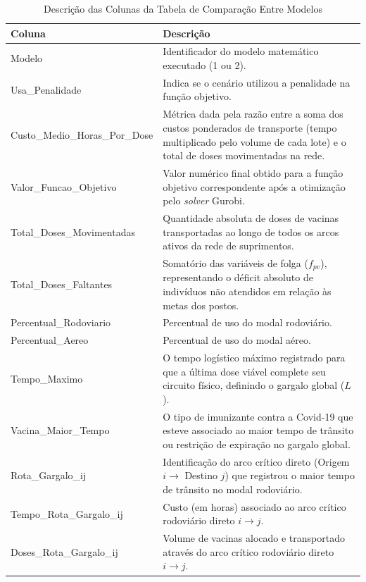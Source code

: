 \begin{longtable}{|l|p{8.5cm}|}
\caption{Descrição das Colunas da Tabela de Comparação Entre Modelos} \label{tab:colunas_comparacao} \\
\hline
\textbf{Coluna} & \textbf{Descrição} \\ \hline
\endhead

\hline \endfoot

Modelo & Identificador do modelo matemático executado (1 ou 2). \\ \hline
Usa\_Penalidade & Indica se o cenário utilizou a penalidade na função objetivo. \\ \hline
Custo\_Medio\_Horas\_Por\_Dose & Métrica dada pela razão entre a soma dos custos ponderados de transporte (tempo multiplicado pelo volume de cada lote) e o total de doses movimentadas na rede. \\ \hline
Valor\_Funcao\_Objetivo & Valor numérico final obtido para a função objetivo correspondente após a otimização pelo \textit{solver} Gurobi. \\ \hline
Total\_Doses\_Movimentadas & Quantidade absoluta de doses de vacinas transportadas ao longo de todos os arcos ativos da rede de suprimentos. \\ \hline
Total\_Doses\_Faltantes & Somatório das variáveis de folga ($f_{pv}$), representando o déficit absoluto de indivíduos não atendidos em relação às metas dos postos. \\ \hline
Percentual\_Rodoviario & Percentual de uso do modal rodoviário. \\ \hline
Percentual\_Aereo & Percentual de uso do modal aéreo. \\ \hline
Tempo\_Maximo & O tempo logístico máximo registrado para que a última dose viável complete seu circuito físico, definindo o gargalo global ($L$). \\ \hline
Vacina\_Maior\_Tempo & O tipo de imunizante contra a Covid-19 que esteve associado ao maior tempo de trânsito ou restrição de expiração no gargalo global. \\ \hline
Rota\_Gargalo\_ij & Identificação do arco crítico direto (Origem $i \to$ Destino $j$) que registrou o maior tempo de trânsito no modal rodoviário. \\ \hline
Tempo\_Rota\_Gargalo\_ij & Custo (em horas) associado ao arco crítico rodoviário direto $i \to j$. \\ \hline
Doses\_Rota\_Gargalo\_ij & Volume de vacinas alocado e transportado através do arco crítico rodoviário direto $i \to j$. \\ \hline

\end{longtable}
